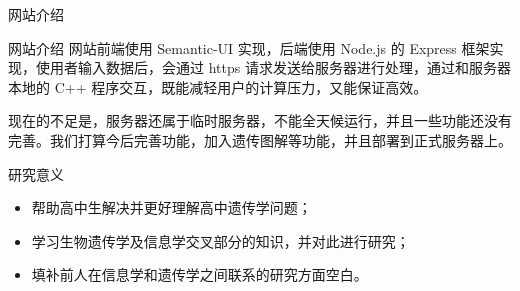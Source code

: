 \documentclass{beamer}
\begin{document}
	\begin{frame}{网站介绍}
	\end{frame}


	\begin{frame}{网站介绍}
		网站前端使用 Semantic-UI 实现，后端使用 Node.js 的 Express 框架实现，使用者输入数据后，会通过 https 请求发送给服务器进行处理，通过和服务器本地的 C++ 程序交互，既能减轻用户的计算压力，又能保证高效。
		
		现在的不足是，服务器还属于临时服务器，不能全天候运行，并且一些功能还没有完善。我们打算今后完善功能，加入遗传图解等功能，并且部署到正式服务器上。
	\end{frame}
	
	\begin{frame}{研究意义}
		\begin{itemize}
		\item 帮助高中生解决并更好理解高中遗传学问题；
		\item 学习生物遗传学及信息学交叉部分的知识，并对此进行研究；
		\item 填补前人在信息学和遗传学之间联系的研究方面空白。
		\end{itemize}
	\end{frame}
\end{document}
